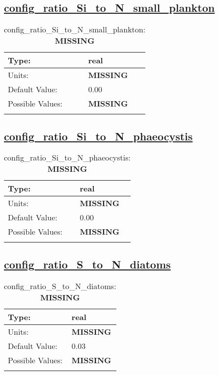 \subsection[config\_ratio\_Si\_to\_N\_small\_plankton]{\hyperref[sec:nm_tab_biogeochemistry]{config\_ratio\_Si\_to\_N\_small\_plankton}}
\label{subsec:nm_sec_config_ratio_Si_to_N_small_plankton}
\begin{center}
\begin{longtable}{| p{2.0in} || p{4.0in} |}
    \hline
    Type: & real \\
    \hline
    Units: & {\bf \color{red} MISSING} \\
    \hline
    Default Value: & 0.00 \\
    \hline
    Possible Values: & {\bf \color{red} MISSING} \\
    \hline
    \caption{config\_ratio\_Si\_to\_N\_small\_plankton: {\bf \color{red} MISSING}}
\end{longtable}
\end{center}
\subsection[config\_ratio\_Si\_to\_N\_phaeocystis]{\hyperref[sec:nm_tab_biogeochemistry]{config\_ratio\_Si\_to\_N\_phaeocystis}}
\label{subsec:nm_sec_config_ratio_Si_to_N_phaeocystis}
\begin{center}
\begin{longtable}{| p{2.0in} || p{4.0in} |}
    \hline
    Type: & real \\
    \hline
    Units: & {\bf \color{red} MISSING} \\
    \hline
    Default Value: & 0.00 \\
    \hline
    Possible Values: & {\bf \color{red} MISSING} \\
    \hline
    \caption{config\_ratio\_Si\_to\_N\_phaeocystis: {\bf \color{red} MISSING}}
\end{longtable}
\end{center}
\subsection[config\_ratio\_S\_to\_N\_diatoms]{\hyperref[sec:nm_tab_biogeochemistry]{config\_ratio\_S\_to\_N\_diatoms}}
\label{subsec:nm_sec_config_ratio_S_to_N_diatoms}
\begin{center}
\begin{longtable}{| p{2.0in} || p{4.0in} |}
    \hline
    Type: & real \\
    \hline
    Units: & {\bf \color{red} MISSING} \\
    \hline
    Default Value: & 0.03 \\
    \hline
    Possible Values: & {\bf \color{red} MISSING} \\
    \hline
    \caption{config\_ratio\_S\_to\_N\_diatoms: {\bf \color{red} MISSING}}
\end{longtable}
\end{center}

